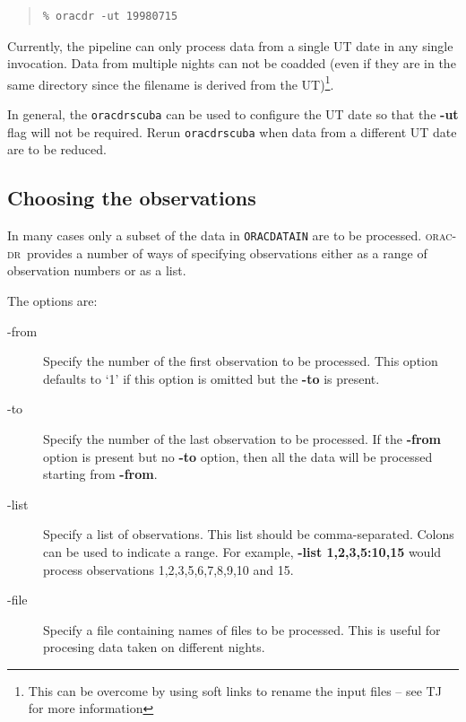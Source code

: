 \documentclass[twoside,11pt]{article}
\newcommand{\xref}[3]{#1}
\newcommand{\xlabel}[1]{}
\renewcommand{\_}{\texttt{\symbol{95}}}
\newcommand{\oracdr}{\xref{\textsc{orac-dr}}{sun230}{}}
\newenvironment{myquote}{\begin{quote}\begin{small}}{\end{small}\end{quote}}
\begin{document}
\begin{myquote}
\begin{verbatim}
% oracdr -ut 19980715
\end{verbatim}
\end{myquote}

Currently, the pipeline can only process data from a single UT date in any
single invocation.  Data from multiple nights can not be coadded (even if they
are in the same directory since the filename is derived from the
UT)\footnote{This can be overcome by using soft links to rename the input files
-- see TJ for more information}.

In general, the \texttt{oracdr\_scuba} can be used to configure the
UT date so that the \textbf{-ut} flag will not be required.
Rerun \texttt{oracdr\_scuba} when data from a different UT date are to
be reduced.

\subsection{Choosing the observations\xlabel{choosing_the_observations}}

In many cases only a subset of the data in \texttt{ORAC\_DATA\_IN} are to be
processed. \oracdr\ provides a number of ways of specifying observations
either as a range of observation numbers or as a list.

The options are:

\begin{description}
\item[-from] \mbox{}

Specify the number of the first observation to be processed.
This option defaults to `1' if this option is omitted but the \textbf{-to} is
present.

\item[-to] \mbox{}

Specify the number of the last observation to be processed. If
the \textbf{-from} option is present but no \textbf{-to} option, then
all the data will be processed starting from \textbf{-from}.

\item[-list] \mbox{}

Specify a list of observations. This list should be comma-separated. Colons
can be used to indicate a range. For example, \textbf{-list 1,2,3,5:10,15}
would process observations 1,2,3,5,6,7,8,9,10 and 15.

\item[-file] \mbox{}

Specify a file containing names of files to be processed. This is useful
for procesing data taken on different nights.

\end{description}
\end{document}
